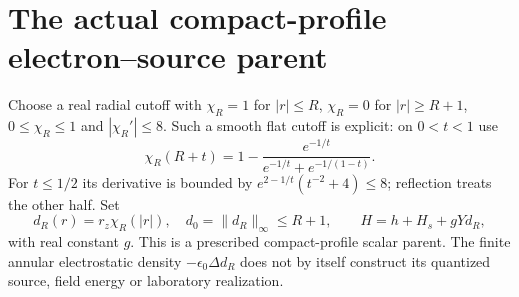 \documentclass[11pt]{article}
\numberwithin{equation}{section}
\theoremstyle{definition}
\theoremstyle{remark}
\begin{document}
\section{The actual compact-profile electron--source parent}
\label{p4h:sec:actual}

Choose a real radial cutoff with
$\chi_R=1$ for $|r|\leq R$, $\chi_R=0$ for $|r|\geq R+1$,
$0\leq\chi_R\leq1$ and $|\chi_R'|\leq8$. Such a smooth
flat cutoff is explicit: on $0<t<1$ use
\[
 \chi_R(R+t)=1-
 \frac{e^{-1/t}}{e^{-1/t}+e^{-1/(1-t)}}.
\]
For $t\leq1/2$ its derivative is bounded by
$e^{2-1/t}(t^{-2}+4)\leq8$; reflection treats the other half.
Set
\begin{equation}\label{p4h:eq:parent}
 d_R(r)=r_z\chi_R(|r|),\quad d_0=\|d_R\|_\infty\leq R+1,\qquad
 H=h+H_s+gYd_R ,
\end{equation}
with real constant $g$. This is a prescribed compact-profile
scalar parent. The finite annular electrostatic density
$-\epsilon_0\Delta d_R$ does not by itself construct its
quantized source, field energy or laboratory realization.
\end{document}
